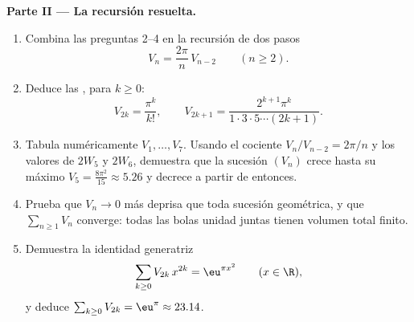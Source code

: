 \begin{problem}[{Problema de fin de semana --- $V_n =
\pi^{n/2}/\Gamma(\frac n2 + 1)$, y la rareza de las dimensiones
altas}]
\medskip
\noindent\textbf{Parte II --- La recursión resuelta.}
\begin{enumerate}[resume]
  \item Combina las preguntas 2--4 en la recursión de dos pasos
        \[
        V_n = \frac{2\pi}{n}\,V_{n-2}
        \qquad (n \geq 2).
        \]
  \item Deduce las , para $k \geq 0$:
        \[
        V_{2k} = \frac{\pi^k}{k!},
        \qquad
        V_{2k+1} = \frac{2^{k+1}\pi^k}{1\cdot3\cdot5\cdots
        (2k+1)} .
        \]
  \item Tabula numéricamente $V_1, \dots, V_7$. Usando el cociente
        $V_n/V_{n-2} = 2\pi/n$ y los valores de $2W_5$ y $2W_6$,
        demuestra que la sucesión $(V_n)$ crece hasta su máximo $V_5
        = \frac{8\pi^2}{15} \approx 5.26$ y decrece a partir de
        entonces.
  \item Prueba que $V_n \to 0$ más deprisa que toda sucesión
        geométrica, y que $\sum_{n\geq1} V_n$ converge: todas las
        bolas unidad juntas tienen volumen total finito.
  \item Demuestra la identidad generatriz
        \[
        \sum_{k\geq0} V_{2k}\,x^{2k} = \eu^{\pi x^2}
        \qquad (x \in \R),
        \]
        y deduce $\sum_{k\geq0}V_{2k} = \eu^\pi \approx 23.14$.
\end{enumerate}


\end{problem}
